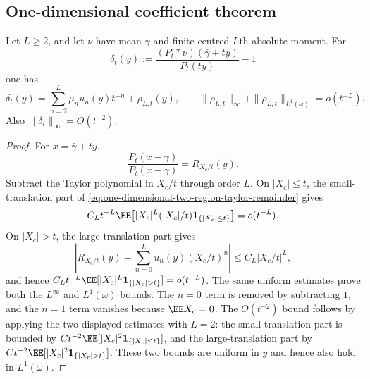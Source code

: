 \subsection{One-dimensional coefficient theorem}

\begin{lemma}%
\label{lem:exact-moment-density-truncation}
Let \(L\ge2\), and let \(\nu\) have mean \(\bar{\gamma}\) and finite centred
\(L\)th absolute moment.  For
\[
\delta_t(y):=
\frac{(P_t*\nu)(\bar{\gamma}+ty)}{P_t(ty)}-1
\]
one has
\begin{equation}\label{eq:exact-moment-density-truncation}
\delta_t(y)=\sum_{n=2}^{L}\mu_nu_n(y)t^{-n}+\rho_{L,t}(y),
\qquad
\|\rho_{L,t}\|_{\infty}+\|\rho_{L,t}\|_{L^1(\omega)}=o(t^{-L}).
\end{equation}
Also \(\|\delta_t\|_\infty=O(t^{-2})\).
\end{lemma}

\begin{proof}
For \(x=\bar{\gamma}+ty\),
\[
\frac{P_t(x-\gamma)}{P_t(x-\bar{\gamma})}
=R_{X_c/t}(y).
\]
Subtract the Taylor polynomial in \(X_c/t\) through order \(L\).  On
\(|X_c|\le t\), the small-translation part of
\eqref{eq:one-dimensional-two-region-taylor-remainder} gives
\[
C_Lt^{-L}\EE\!\left[|X_c|^L(|X_c|/t)\mathbf1_{\{|X_c|\le t\}}\right]
=o(t^{-L}).
\]
On \(|X_c|>t\), the large-translation part gives
\[
\left|R_{X_c/t}(y)-\sum_{n=0}^{L}u_n(y)(X_c/t)^n\right|
\le C_L|X_c/t|^L,
\]
and hence \(C_Lt^{-L}\EE[|X_c|^L\mathbf1_{\{|X_c|>t\}}]=o(t^{-L})\).  The same
uniform estimates prove both the \(L^\infty\) and \(L^1(\omega)\) bounds.  The
\(n=0\) term is removed by subtracting \(1\), and the \(n=1\) term vanishes
because \(\EE X_c=0\).  The \(O(t^{-2})\) bound follows by applying the two
displayed estimates with \(L=2\): the small-translation part is bounded by
\(Ct^{-2}\EE[|X_c|^2\mathbf1_{\{|X_c|\le t\}}]\), and the
large-translation part by
\(Ct^{-2}\EE[|X_c|^2\mathbf1_{\{|X_c|>t\}}]\).  These two bounds are
uniform in \(y\) and hence also hold in \(L^1(\omega)\).
\end{proof}

